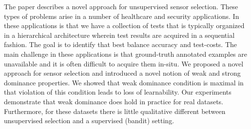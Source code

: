 The paper describes a novel approach for unsupervised sensor selection. These types of problems arise in a number of healthcare and security applications. In these applications is that we have a collection of tests that is typically organized in a hierarchical architecture wherein test results are acquired in a sequential fashion. The goal is to identify that best balance accuracy and test-costs. The main challenge in these applications is that ground-truth annotated examples are unavailable and it is often difficult to acquire them in-situ. We proposed a novel approach for sensor selection and introduced a novel notion of weak and strong dominance properties. We showed that weak dominance condition is maximal in that violation of this condition leads to loss of learnability. Our experiments demonstrate that weak dominance does hold in practice for real datasets. Furthermore, for these datasets there is little qualitative different between unsupervised selection and a supervised (bandit) setting. 


%
%

